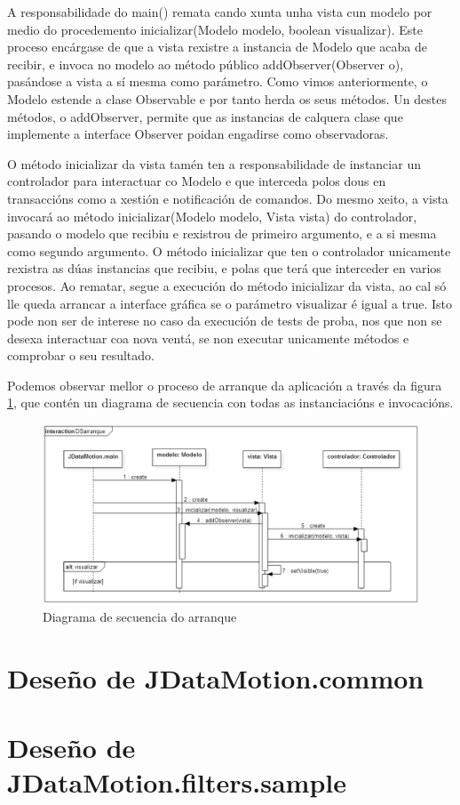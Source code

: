 A responsabilidade do main() remata cando xunta unha vista cun modelo por medio do procedemento inicializar(Modelo modelo, boolean visualizar). Este proceso encárgase de que a vista rexistre a instancia de Modelo que acaba de recibir, e invoca no modelo ao método público addObserver(Observer o), pasándose a vista a sí mesma como parámetro. Como vimos anteriormente, o Modelo estende a clase Observable e por tanto herda os seus métodos. Un destes métodos, o addObserver, permite que as instancias de calquera clase que implemente a interface Observer poidan engadirse como observadoras.

O método inicializar da vista tamén ten a responsabilidade de instanciar un controlador para interactuar co Modelo e que interceda polos dous en transaccións como a xestión e notificación de comandos. Do mesmo xeito, a vista invocará ao método inicializar(Modelo modelo, Vista vista) do controlador, pasando o modelo que recibiu e rexistrou de primeiro argumento, e a si mesma como segundo argumento. O método inicializar que ten o controlador unicamente rexistra as dúas instancias que recibiu, e polas que terá que interceder en varios procesos. Ao rematar, segue a execución do método inicializar da vista, ao cal só lle queda arrancar a interface gráfica se o parámetro visualizar é igual a true. Isto pode non ser de interese no caso da execución de tests de proba, nos que non se desexa interactuar coa nova ventá, se non executar unicamente métodos e comprobar o seu resultado.

Podemos observar mellor o proceso de arranque da aplicación a través da figura \ref{DSarranque}, que contén un diagrama de secuencia con todas as instanciacións e invocacións.

\begin{figure}
\centering
\includegraphics[width=\textwidth,height=\textheight,keepaspectratio]{figuras/DSarranque}
\caption{Diagrama de secuencia do arranque}
\label{DSarranque}
\end{figure}

\section{Deseño de JDataMotion.common}

\section{Deseño de JDataMotion.filters.sample}